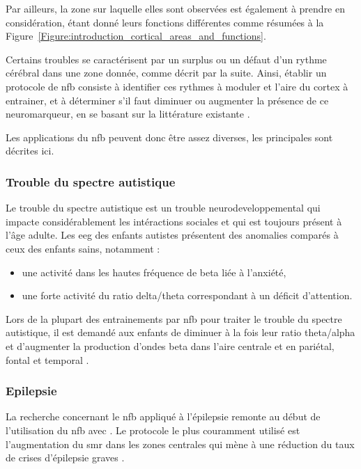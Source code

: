 Par ailleurs, la zone sur laquelle elles sont observées est également à prendre en considération, étant donné leurs fonctions différentes comme résumées
à la Figure~\ref{Figure:introduction_cortical_areas_and_functions}.

Certains troubles se caractérisent par un surplus ou un défaut d'un rythme cérébral dans une zone donnée, comme décrit par la suite. 
Ainsi, établir un protocole de \gls{nfb} consiste à identifier ces rythmes à moduler et l'aire 
du cortex à entrainer, et à déterminer s'il faut diminuer ou augmenter la présence de ce neuromarqueur, en se basant sur la littérature 
existante \citep{Micoulaud2019}.

Les applications du \gls{nfb} peuvent donc être assez diverses, les principales sont décrites ici. 

\subsubsection{Trouble du spectre autistique}

Le trouble du spectre autistique est un trouble neurodeveloppemental qui impacte considérablement les intéractions sociales et qui est toujours présent à 
l'âge adulte. Les \gls{eeg} des enfants autistes présentent des anomalies comparés à ceux des enfants sains, notamment \citep{Coben2010, Kouijzer2010} :
\begin{itemize}
\item une activité dans les hautes fréquence de beta liée à l'anxiété,
\item une forte activité du ratio delta/theta correspondant à un déficit d'attention.
\end{itemize}
Lors de la plupart des entrainements par \gls{nfb} pour traiter le trouble du spectre autistique, il est demandé aux enfants de diminuer à la fois leur ratio 
theta/alpha et d'augmenter la production d'ondes beta dans l'aire centrale \citep{Thompson2010} et en pariétal, fontal et temporal \citep{Othmer2007}. 

\subsubsection{Epilepsie}

La recherche concernant le \gls{nfb} appliqué à l'épilepsie remonte au début de l'utilisation du \gls{nfb} avec \citet{Sterman1974}. Le protocole le plus
couramment utilisé est l'augmentation du \gls{smr} dans les zones centrales qui mène à une réduction du taux de crises 
d'épilepsie graves \citep{Hughes2008, Walker2010, Tan2009, Sterman2010}.

